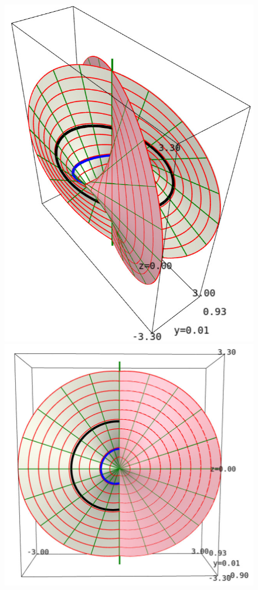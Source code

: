 \begin{figure}
\centerline{\includegraphics[height=0.35\textheight]{ksm_2_sheets.jpg}\quad
\includegraphics[height=0.25\textheight]{ksm_2_sheets_face_on.jpg}\quad
}
\end{figure}
